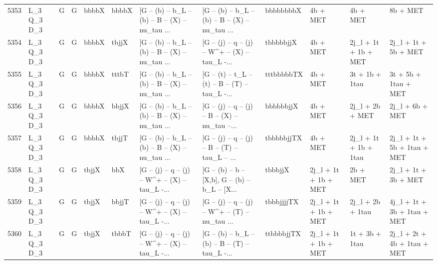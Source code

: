 \begin{tabular}{llllllllllll}
5353 &  L\_3 Q\_3 D\_3 &     G &     G &       bbbbX &       bbbbX &  [G -- (b) -- b\_L -- (b) -- B -- (X) -- nu\_tau ... &  [G -- (b) -- b\_L -- (b) -- B -- (X) -- nu\_tau ... &   bbbbbbbbX &                 4b + MET &                 4b + MET &                           8b + MET \\
5354 &  L\_3 Q\_3 D\_3 &     G &     G &       bbbbX &       tbjjX &  [G -- (b) -- b\_L -- (b) -- B -- (X) -- nu\_tau ... &  [G -- (j) -- q -- (j) -- W\textasciicircum + -- (X) -- tau\_L -... &   tbbbbbjjX &                 4b + MET &     2j\_l + 1t + 1b + MET &               2j\_l + 1t + 5b + MET \\
5355 &  L\_3 Q\_3 D\_3 &     G &     G &       bbbbX &       tttbT &  [G -- (b) -- b\_L -- (b) -- B -- (X) -- nu\_tau ... &  [G -- (t) -- t\_L -- (t) -- B -- (T) -- tau\_L -... &  tttbbbbbTX &                 4b + MET &           3t + 1b + 1tau &               3t + 5b + 1tau + MET \\
5356 &  L\_3 Q\_3 D\_3 &     G &     G &       bbbbX &       bbjjX &  [G -- (b) -- b\_L -- (b) -- B -- (X) -- nu\_tau ... &  [G -- (j) -- q -- (j) -- B -- (X) -- nu\_tau --... &   bbbbbbjjX &                 4b + MET &          2j\_l + 2b + MET &                    2j\_l + 6b + MET \\
5357 &  L\_3 Q\_3 D\_3 &     G &     G &       bbbbX &       tbjjT &  [G -- (b) -- b\_L -- (b) -- B -- (X) -- nu\_tau ... &  [G -- (j) -- q -- (j) -- B -- (T) -- tau\_L -- ... &  tbbbbbjjTX &                 4b + MET &    2j\_l + 1t + 1b + 1tau &        2j\_l + 1t + 5b + 1tau + MET \\
5358 &  L\_3 Q\_3 D\_3 &     G &     G &       tbjjX &         bbX &  [G -- (j) -- q -- (j) -- W\textasciicircum + -- (X) -- tau\_L -... &  [G -- (b) -- b -- [X,b], G -- (b) -- b\_L -- [X... &     tbbbjjX &     2j\_l + 1t + 1b + MET &                 2b + MET &               2j\_l + 1t + 3b + MET \\
5359 &  L\_3 Q\_3 D\_3 &     G &     G &       tbjjX &       bbjjT &  [G -- (j) -- q -- (j) -- W\textasciicircum + -- (X) -- tau\_L -... &  [G -- (j) -- q -- (j) -- W\textasciicircum + -- (T) -- nu\_tau ... &  tbbbjjjjTX &     2j\_l + 1t + 1b + MET &         2j\_l + 2b + 1tau &        4j\_l + 1t + 3b + 1tau + MET \\
5360 &  L\_3 Q\_3 D\_3 &     G &     G &       tbjjX &       tbbbT &  [G -- (j) -- q -- (j) -- W\textasciicircum + -- (X) -- tau\_L -... &  [G -- (b) -- b\_L -- (b) -- B -- (T) -- tau\_L -... &  ttbbbbjjTX &     2j\_l + 1t + 1b + MET &           1t + 3b + 1tau &        2j\_l + 2t + 4b + 1tau + MET \\

\end{tabular}

